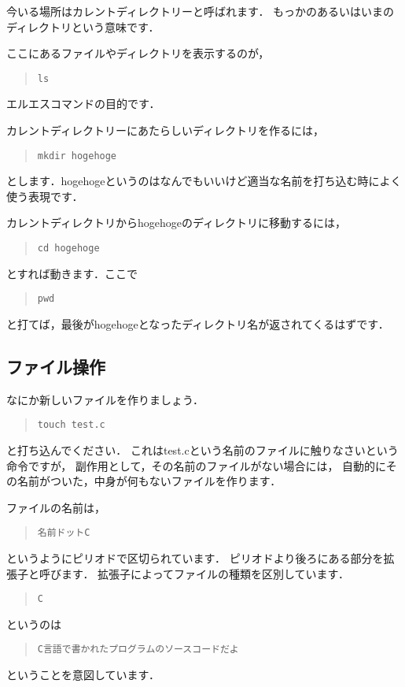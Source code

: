 \documentclass[12pt,a4paper]{jsarticle}
\begin{document}
今いる場所はカレントディレクトリーと呼ばれます．
もっかのあるいはいまのディレクトリという意味です．

ここにあるファイルやディレクトリを表示するのが，
\begin{quote}\begin{verbatim}
ls
\end{verbatim}\end{quote}
エルエスコマンドの目的です．

カレントディレクトリーにあたらしいディレクトリを作るには，
\begin{quote}\begin{verbatim}
mkdir hogehoge
\end{verbatim}\end{quote}
とします．hogehogeというのはなんでもいいけど適当な名前を打ち込む時によく使う表現です．

カレントディレクトリからhogehogeのディレクトリに移動するには，
\begin{quote}\begin{verbatim}
cd hogehoge
\end{verbatim}\end{quote}
とすれば動きます．ここで
\begin{quote}\begin{verbatim}
pwd
\end{verbatim}\end{quote}
と打てば，最後がhogehogeとなったディレクトリ名が返されてくるはずです．

\subsection{ファイル操作}
なにか新しいファイルを作りましょう．
\begin{quote}\begin{verbatim}
touch test.c
\end{verbatim}\end{quote}
と打ち込んでください．
これはtest.cという名前のファイルに触りなさいという命令ですが，
副作用として，その名前のファイルがない場合には，
自動的にその名前がついた，中身が何もないファイルを作ります．

ファイルの名前は，
\begin{quote}\begin{verbatim}
名前ドットC
\end{verbatim}\end{quote}
というようにピリオドで区切られています．
ピリオドより後ろにある部分を拡張子と呼びます．
拡張子によってファイルの種類を区別しています．
\begin{quote}\begin{verbatim}
C
\end{verbatim}\end{quote}
というのは
\begin{quote}\begin{verbatim}
C言語で書かれたプログラムのソースコードだよ
\end{verbatim}\end{quote}
ということを意図しています．
\end{document}
